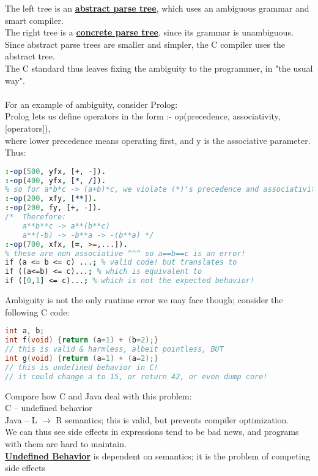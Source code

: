 \documentclass[../../lecture_notes.tex]{subfiles}
\begin{document}
\noindent The left tree is an \textbf{\underline{abstract parse tree}}, 
	which uses an ambiguous grammar and smart compiler.\\
The right tree is a \textbf{\underline{concrete parse tree}}, since its grammar is unambiguous.\\
Since abstract parse trees are smaller and simpler, the C compiler uses the abstract tree.\\
The C standard thus leaves fixing the ambiguity to the programmer, in "the usual way".\\
\\
For an example of ambiguity, consider Prolog:\\
Prolog lets us define operators in the form :- op(precedence, associativity, [operators]),\\
	where lower precedence means operating first, and y is the associative parameter.
Thus: \begin{lstlisting}[language=Prolog]
:-op(500, yfx, [+, -]).
:-op(400, yfx, [*, /]).
% so for a*b*c -> (a+b)*c, we violate (*)'s precedence and associativity! 
:-op(200, xfy, [**]).
:-op(200, fy, [+, -]).
/*	Therefore: 
	a**b**c -> a**(b**c)
	a**(-b) -> -b**a -> -(b**a) */
:-op(700, xfx, [=, >=,...]).
% these are non associative ^^^ so a==b==c is an error!
if (a <= b <= c) ...; % valid code! but translates to
if ((a<=b) <= c)...; % which is equivalent to
if ([0,1] <= c)...; % which is not the expected behavior!
\end{lstlisting}
Ambiguity is not the only runtime error we may face though; consider the following C code:
\begin{lstlisting}[language=C]
int a, b;
int f(void) {return (a=1) + (b=2);}
// this is valid & harmless, albeit pointless, BUT
int g(void) {return (a=1) + (a=2);}
// this is undefined behavior in C!
// it could change a to 15, or return 42, or even dump core!
\end{lstlisting}
Compare how C and Java deal with this problem:\\
	\indent C -- undefined behavior\\
	\indent Java -- L $\to$ R semantics; this is valid, but prevents compiler optimization.\\
We can thus see side effects in expressions tend to be bad news, and programs with them are hard to maintain.\\
\textbf{\underline{Undefined Behavior}} is dependent on semantics; it is the problem of competing side effects\\
\\
\end{document}
